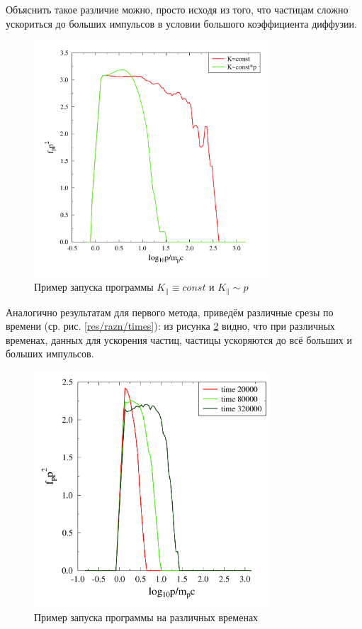 \documentclass[a4paper,14pt]{extarticle} %
\begin{document}
Объяснить такое различие можно, просто исходя из того, что частицам сложно ускориться до больших импульсов в условии большого коэффициента диффузии.
\begin{figure}[H]
\centering
\includegraphics[width=250pt]{stoh_bom_or_not}
\caption{Пример запуска программы $K_\parallel\equiv const$ и $K_\parallel \sim p $}
\label{res/stoh/bom}
\end{figure}

Аналогично результатам для первого метода, приведём различные срезы по времени (ср. рис. \ref{res/razn/times}): из рисунка \ref{res/stoh/times} видно, что при различных временах, данных для ускорения частиц, частицы ускоряются до всё больших и больших импульсов.
\begin{figure}[H]
\centering
\includegraphics[width=250pt]{stoh_times}
\caption{Пример запуска программы на различных временах}
\label{res/stoh/times}
\end{figure}
\end{document}
